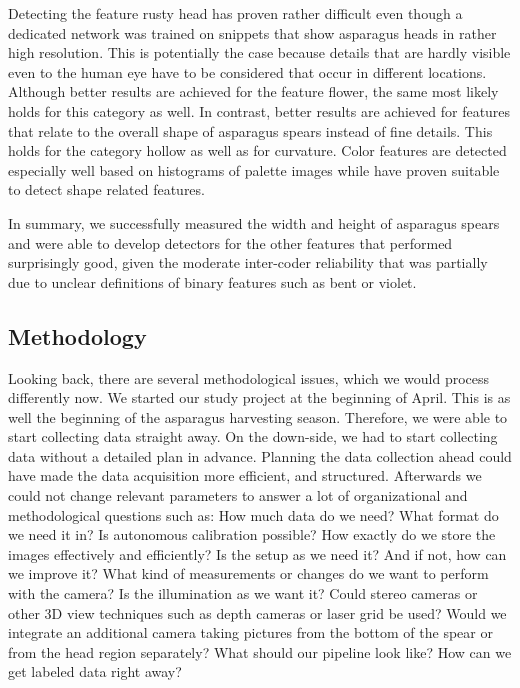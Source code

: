 \bigskip
Detecting the feature rusty head has proven rather difficult even though a dedicated network was trained on snippets that show asparagus heads in rather high resolution. This is potentially the case because details that are hardly visible even to the human eye have to be considered that occur in different locations. Although better results are achieved for the feature flower, the same most likely holds for this category as well. In contrast, better results are achieved for features that relate to the overall shape of asparagus spears instead of fine details. This holds for the category hollow as well as  for curvature. Color features are detected especially well based on histograms of palette images while  have proven suitable to detect shape related features.

In summary, we successfully measured the width and height of asparagus spears and were able to develop detectors for the other features that performed surprisingly good, given the moderate inter-coder reliability that was partially due to unclear definitions of binary features such as bent or violet.


\subsection{Methodology}
\label{sec:DiscussionMethodology}

Looking back, there are several methodological issues, which we would process differently now. We started our study project at the beginning of April. This is as well the beginning of the asparagus harvesting season. Therefore,  we were able to start collecting data straight away. On the down-side, we had to start collecting data without a detailed plan in advance. Planning the data collection ahead could have made the data acquisition more efficient, and structured. Afterwards we could not change relevant parameters to answer a lot of organizational and methodological questions such as: How much data do we need? What format do we need it in? Is autonomous calibration possible? How exactly do we store the images effectively and efficiently? Is the setup as we need it? And if not, how can we improve it? What kind of measurements or changes do we want to perform with the camera? Is the illumination as we want it? Could stereo cameras or other 3D view techniques such as depth cameras or laser grid be used? Would we integrate an additional camera taking pictures from the bottom of the spear or from the head region separately?  What should our pipeline look like? How can we get labeled data right away?

